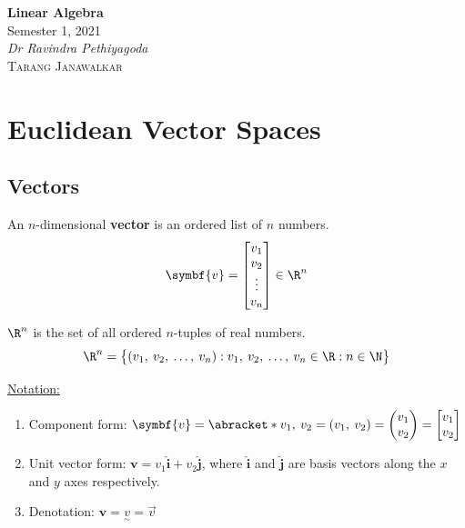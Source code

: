 \documentclass{article}
\date{}
\newcommand{\unitName}{Linear Algebra}
\newcommand{\unitTime}{Semester 1, 2021}
\newcommand{\unitCoordinator}{Dr Ravindra Pethiyagoda}
\newcommand{\documentAuthors}{\textsc{Tarang Janawalkar}}
\begin{document}
%
\begin{titlepage}
    \vspace*{\fill}
    \begin{center}
        \LARGE{\textbf{\unitName}} \\[0.1in]
        \normalsize{\unitTime} \\[0.2in]
        \normalsize\textit{\unitCoordinator} \\[0.2in]
        \documentAuthors
    \end{center}
    \vspace*{\fill}
    \doclicenseThis
    \thispagestyle{empty}
\end{titlepage}
\newpage
%
\tableofcontents
\newpage
%
\section{Euclidean Vector Spaces}
\subsection{Vectors}
\begin{definition}
    An \(n\)-dimensional \textbf{vector} is an ordered list of \(n\)
    numbers.
    \begin{equation*}
        \symbf{v} =
        \begin{bmatrix}
            v_1    \\
            v_2    \\
            \vdots \\
            v_n
        \end{bmatrix}
        \in \R^n
    \end{equation*}
\end{definition}
\begin{theorem}
    \(\R^n\) is the set of all ordered \(n\)-tuples of real
    numbers.
    \begin{equation*}
        \R^n = \bigl\{\left(v_1,\: v_2,\: \ldots,\: v_n\right): v_1,\: v_2,\: \ldots,\: v_n \in \R: n \in \N\bigr\}
    \end{equation*}
\end{theorem}
\underline{Notation:}
\begin{enumerate}
    \item Component form: \(\symbf{v} = \abracket*{v_1,\:
          v_2} = \left(v_1,\: v_2\right) =
          \begin{pmatrix}
              v_1 \\
              v_2
          \end{pmatrix}
          =
          \begin{bmatrix}
              v_1 \\
              v_2
          \end{bmatrix}
          \)
    \item Unit vector form: \(\symbf{v} = v_1\hat{\symbf{i}} +
          v_2\hat{\symbf{j}}\), where \(\hat{\symbf{i}}\) and
          \(\hat{\symbf{j}}\) are basis vectors along the \(x\)
          and \(y\) axes respectively.
    \item Denotation: \(\symbf{v} = \underset{\sim}{v} = \vec{v}\)
\end{enumerate}
\end{document}
